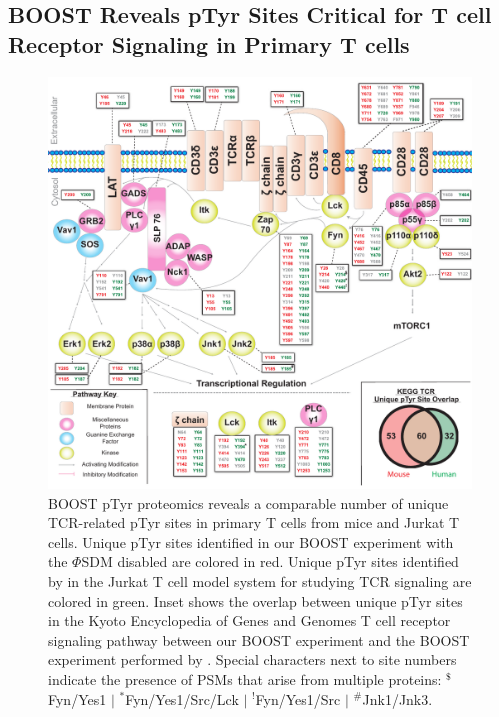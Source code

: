 \documentclass[journal=jprobs,manuscript=article]{achemso}
\begin{document}
\subsection{BOOST Reveals pTyr Sites Critical for T cell Receptor Signaling in Primary T cells}

\begin{figure}
\centering
\includegraphics[width=170mm]{figures/main_figs/biologically_interesting.pdf}
\caption{BOOST pTyr proteomics reveals a comparable number of unique TCR-related pTyr sites in primary T cells from mice and Jurkat T cells. Unique pTyr sites identified in our BOOST experiment with the $\Phi$SDM disabled are colored in red. Unique pTyr sites identified by \citeauthor{chua2020tandem} \citeyear{chua2020tandem} in the Jurkat T cell model system for studying TCR signaling are colored in green. Inset shows the overlap between unique pTyr sites in the Kyoto Encyclopedia of Genes and Genomes T cell receptor signaling pathway between our BOOST experiment and the BOOST experiment performed by \citeauthor{chua2020tandem} \citeyear{chua2020tandem}. Special characters next to site numbers indicate the presence of PSMs that arise from multiple proteins:  $^{\textbf{\$}}$Fyn/Yes1 $|$ $^{\textbf{*}}$Fyn/Yes1/Src/Lck $|$ $^{\textbf{!}}$Fyn/Yes1/Src $|$ $^{\textbf{\#}}$Jnk1/Jnk3.  }\label{biologically_interesting}
\end{figure}
\end{document}
